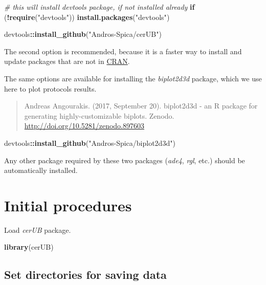 \documentclass[12pt,]{book}
\newenvironment{Shaded}{\begin{snugshade}}{\end{snugshade}}
\newcommand{\CommentTok}[1]{\textcolor[rgb]{0.56,0.35,0.01}{\textit{#1}}}
\newcommand{\ControlFlowTok}[1]{\textcolor[rgb]{0.13,0.29,0.53}{\textbf{#1}}}
\newcommand{\KeywordTok}[1]{\textcolor[rgb]{0.13,0.29,0.53}{\textbf{#1}}}
\newcommand{\NormalTok}[1]{#1}
\newcommand{\OperatorTok}[1]{\textcolor[rgb]{0.81,0.36,0.00}{\textbf{#1}}}
\newcommand{\StringTok}[1]{\textcolor[rgb]{0.31,0.60,0.02}{#1}}
\begin{document}
\begin{Shaded}
\begin{Highlighting}[]
\CommentTok{# this will install devtools package, if not installed already}
\ControlFlowTok{if}\NormalTok{ (}\OperatorTok{!}\KeywordTok{require}\NormalTok{(}\StringTok{"devtools"}\NormalTok{))}
    \KeywordTok{install.packages}\NormalTok{(}\StringTok{"devtools"}\NormalTok{) }

\NormalTok{devtools}\OperatorTok{::}\KeywordTok{install_github}\NormalTok{(}\StringTok{"Andros-Spica/cerUB"}\NormalTok{)}
\end{Highlighting}
\end{Shaded}

The second option is recommended, because it is a faster way to install and update packages that are not in \href{cran.r-project.org}{CRAN}.

The same options are available for installing the \emph{biplot2d3d} package, which we use here to plot protocols results.

\begin{quote}
Andreas Angourakis. (2017, September 20). biplot2d3d - an R package for generating highly-customizable biplots. Zenodo. \url{http://doi.org/10.5281/zenodo.897603}
\end{quote}

\begin{Shaded}
\begin{Highlighting}[]
\NormalTok{devtools}\OperatorTok{::}\KeywordTok{install_github}\NormalTok{(}\StringTok{"Andros-Spica/biplot2d3d"}\NormalTok{)}
\end{Highlighting}
\end{Shaded}

Any other package required by these two packages (\emph{ade4}, \emph{rgl}, etc.) should be automatically installed.

\hypertarget{init}{%
\chapter{Initial procedures}\label{init}}

Load \emph{cerUB} package.

\begin{Shaded}
\begin{Highlighting}[]
\KeywordTok{library}\NormalTok{(cerUB)}
\end{Highlighting}
\end{Shaded}

\hypertarget{set-directories-for-saving-data}{%
\section{Set directories for saving data}\label{set-directories-for-saving-data}}
\end{document}
